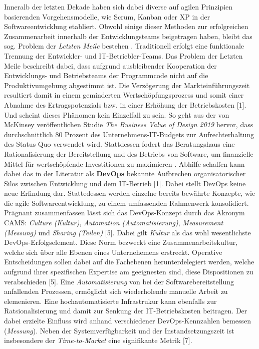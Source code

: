 Inneralb der letzten Dekade haben sich dabei diverse auf agilen Prinzipien basierenden Vorgehensmodelle, wie Scrum, Kanban oder \ac*{XP} in der Softwareentwicklung etabliert. Obwohl einige dieser Methoden zur erfolgreichen Zusammenarbeit innerhalb der Entwicklungsteams beigetragen haben, bleibt das sog. Problem der \textit{Letzten Meile} bestehen \cite{Qentelli.20230305}. Traditionell erfolgt eine funktionale Trennung der Entwickler- und IT-Betriebler-Teams. Das Problem der Letzten Meile beschreibt dabei, dass aufgrund ausbleibender Kooperation der Entwicklungs- und Betriebsteams der Programmcode nicht auf die Produktivumgebung abgestimmt ist. Die Verzögerung der Markteinführungszeit resultiert damit in einem geminderten Wertschöpfungsprozess und somit einer Abnahme des Ertragspotenzials bzw. in einer Erhöhung der Betriebskosten \cite{Halstenberg.2020}[1]. Und scheint dieses Phänomen kein Einzelfall zu sein. So geht aus der von McKinsey veröffentlichen Studie \textit{The Business Value of Design 2019} hervor, dass durchschnittlich 80 Prozent des Unternehmens-IT-Budgets zur Aufrechterhaltung des Status Quo verwendet wird. Stattdessen fodert das Beratungshaus eine Rationalisierung der Bereitstellung und des Betriebs von Software, um finanzielle Mittel für wertschöpfende Investitionen zu maximieren \cite{.20230305}. Abhilfe schaffen kann dabei das in der Literatur als \textbf{\ac*{DevOps}} bekannte Aufbrechen organisatorischer Silos zwischen Entwicklung und dem IT-Betrieb \cite{Halstenberg.2020}[1]. 
Dabei stellt DevOps keine neue Erfindung dar. Stattedessen werden einzelne bereits bewährte Konzepte, wie die agile Softwareentwicklung, zu einem umfassenden Rahmenwerk konsolidiert. Prägnant zusammenfassen lässt sich das DevOps-Konzept durch das Akronym CAMS: \textit{Culture (Kultur)}, \textit{Automation (Automatisierung)}, \textit{Measurement (Messung)} und \textit{Sharing (Teilen)} \cite{Halstenberg.2020}[5]. Dabei gilt \textit{Kultur} als das wohl wesentlichste DevOps-Erfolgselement. Diese Norm bezweckt eine Zusammenarbeitskultur, welche sich über alle Ebenen eines Unternehemens erstreckt. Operative Entscheidungen sollen dabei auf die Fachebenen herunterdelegiert werden, welche aufgrund ihrer spezifischen Expertise am geeignesten sind, diese Dispositionen zu verabschieden \cite{Halstenberg.2020}[5]. Eine \textit{Automatisierung} von bei der Softwarebereitstellung anfallenden Prozessen, ermöglicht sich wiederholende manuelle Arbeit zu elemenieren. Eine hochautomatisierte Infrastrukur kann ebenfalls zur Ratsionalisierung und damit zur Senkung der IT-Betriebskosten beitragen. Der dabei erzielte Einfluss wird anhand verschiedener DevOps-Kennzahlen bemessen (\textit{Messung}). Neben der Systemverfügbarkeit und der Instandsetzungszeit ist insbesondere der \textit{Time-to-Market} eine signifikante Metrik \cite{Halstenberg.2020}[7]. 

